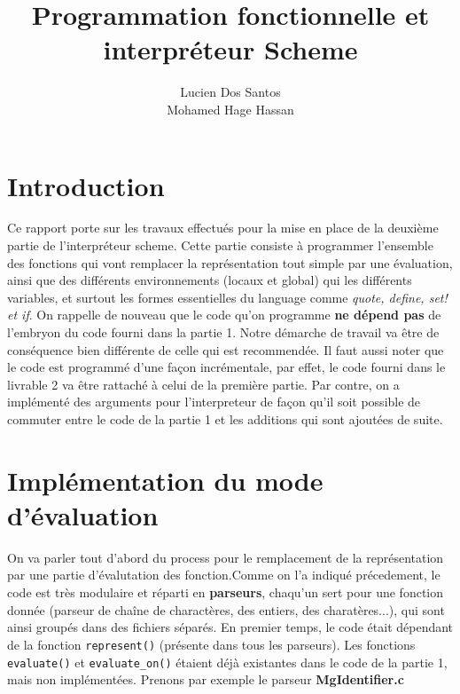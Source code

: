 \documentclass[11pt]{article}
\begin{document}
 


\title{Programmation fonctionnelle et interpr\'eteur Scheme}
\author{Lucien Dos Santos \\ Mohamed Hage Hassan}
\maketitle

\tableofcontents
\clearpage

\section{Introduction}
 
Ce rapport porte sur les travaux effectu\'es pour la mise en place de la deuxi\`eme partie de l'interpr\'eteur scheme. Cette partie consiste \`a programmer l'ensemble des fonctions qui vont remplacer la repr\'esentation tout simple par une \'evaluation, ainsi que des diff\'erents environnements (locaux et global) qui les diff\'erents variables, et surtout les formes essentielles du language comme \textit{quote, define, set! et if}.\newline\newline
On rappelle de nouveau que le code qu'on programme \textbf{ne d\'epend pas} de l'embryon du code fourni dans la partie 1. Notre d\'emarche de travail va \^etre de cons\'equence bien diff\'erente de celle qui est recommend\'ee.\newline\newline
Il faut aussi noter que le code est programm\'e d'une fa\c con incr\'ementale, par effet, le code fourni dans le livrable 2 va \^etre rattach\'e \`a celui de la premi\`ere partie. Par contre, on a impl\'ement\'e des arguments pour l'interpreteur de fa\c con qu'il soit possible de commuter entre le code de la partie 1 et les additions qui sont ajout\'ees de suite.

\section{Impl\'ementation du mode d'\'evaluation}
On va parler tout d'abord du process pour le remplacement de la repr\'esentation par une partie d'\'evalutation des fonction.\newline Comme on l'a indiqu\'e pr\'ecedement, le code est tr\`es modulaire et r\'eparti en \textbf{parseurs}, chaqu'un sert pour une fonction donn\'ee (parseur de cha\^ine de charact\`eres, des entiers, des charat\`eres...), qui sont ainsi group\'es dans des fichiers s\'epar\'es. En premier temps, le code \'etait d\'ependant de la fonction \texttt{represent()} (pr\'esente dans tous les parseurs). \newline\newline Les fonctions \texttt{evaluate()} et \texttt{evaluate\_on()} \'etaient d\'ej\`a existantes dans le code de la partie 1, mais non impl\'ement\'ees. Prenons par exemple le parseur \textbf{MgIdentifier.c}
\end{document}
